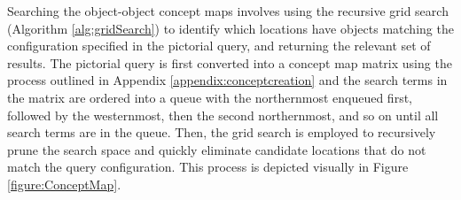 Searching the object-object concept maps involves using the recursive grid search (Algorithm \ref{alg:gridSearch}) to identify which locations have objects matching the configuration specified in the pictorial query, and returning the relevant set of results. 
The pictorial query is first converted into a concept map matrix using the process outlined in Appendix \ref{appendix:conceptcreation} and the search terms in the matrix are ordered into a queue with the northernmost enqueued first, followed by the westernmost, then the second northernmost, and so on until all search terms are in the queue.
Then, the grid search is employed to recursively prune the search space and quickly eliminate candidate locations that do not match the query configuration.
This process is depicted visually in Figure \ref{figure:ConceptMap}.



